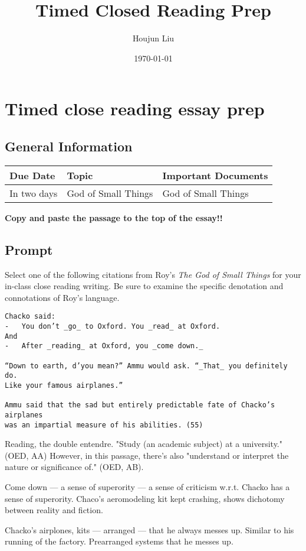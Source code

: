 \documentclass[letterpaper]{article}
\author{Houjun Liu}
\date{\today}
\title{Timed Closed Reading Prep}
\renewcommand{\tableofcontents}{}
\begin{document}
\tableofcontents



\section{Timed close reading essay prep}
\label{sec:org3c282a8}
\subsection{General Information}
\label{sec:orgdbde16d}
\begin{center}
\begin{tabular}{lll}
Due Date & Topic & Important Documents\\
\hline
In two days & God of Small Things & God of Small Things\\
\end{tabular}
\end{center}

\textbf{Copy and paste the passage to the top of the essay!!}

\subsection{Prompt}
\label{sec:orgbf52bc8}
Select one of the following citations from Roy's \emph{The God of Small
Things} for your in-class close reading writing. Be sure to examine the
specific denotation and connotations of Roy's language.

\begin{verbatim}
Chacko said:
-   You don’t _go_ to Oxford. You _read_ at Oxford.
And
-   After _reading_ at Oxford, you _come down._

“Down to earth, d’you mean?” Ammu would ask. “_That_ you definitely do. 
Like your famous airplanes.”

Ammu said that the sad but entirely predictable fate of Chacko’s airplanes 
was an impartial measure of his abilities. (55)
\end{verbatim}

Reading, the double entendre. "Study (an academic subject) at a
university." (OED, AA) However, in this passage, there's also
"understand or interpret the nature or significance of." (OED, AB).

Come down --- a sense of superority --- a sense of criticism w.r.t.
Chacko has a sense of superority. Chaco's aeromodeling kit kept
crashing, shows dichotomy between reality and fiction.

Chacko's airplones, kits --- arranged --- that he always messes up.
Similar to his running of the factory. Prearranged systems that he
messes up.
\end{document}
